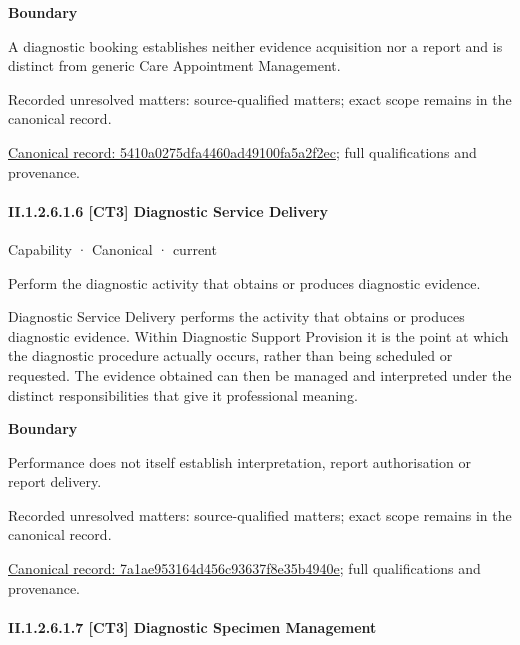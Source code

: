 \textbf{Boundary}



A diagnostic booking establishes neither evidence acquisition nor a report and is distinct from generic Care Appointment Management.


{\small Recorded unresolved matters: source-qualified matters; exact scope remains in the canonical record.}\par
{\footnotesize \href{../../../../continuum/strategy/capability/5410a0275dfa4460ad49100fa5a2f2ec.md}{Canonical record: 5410a0275dfa4460ad49100fa5a2f2ec}; full qualifications and provenance.}\par
\paragraph*{II.1.2.6.1.6 [CT3] Diagnostic Service Delivery}
\label{navigation:II.1.2.6.1.6}

\label{element:7a1ae953164d456c93637f8e35b4940e}
{\small Capability · Canonical · current}\par

Perform the diagnostic activity that obtains or produces diagnostic evidence.



Diagnostic Service Delivery performs the activity that obtains or produces diagnostic evidence. Within Diagnostic Support Provision it is the point at which the diagnostic procedure actually occurs, rather than being scheduled or requested. The evidence obtained can then be managed and interpreted under the distinct responsibilities that give it professional meaning.



\textbf{Boundary}



Performance does not itself establish interpretation, report authorisation or report delivery.


{\small Recorded unresolved matters: source-qualified matters; exact scope remains in the canonical record.}\par
{\footnotesize \href{../../../../continuum/strategy/capability/7a1ae953164d456c93637f8e35b4940e.md}{Canonical record: 7a1ae953164d456c93637f8e35b4940e}; full qualifications and provenance.}\par
\paragraph*{II.1.2.6.1.7 [CT3] Diagnostic Specimen Management}
\label{navigation:II.1.2.6.1.7}

